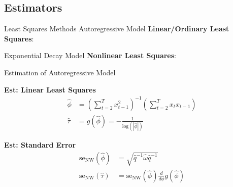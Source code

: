 \documentclass[12pt]{beamer}
\begin{document}
\subsection{Estimators}
\begin{frame}{Least Squares Methods}
Autoregressive Model \textbf{Linear/Ordinary Least Squares}:\\
\begin{center}
\end{center}

Exponential Decay Model \textbf{Nonlinear Least Squares}:\\
\vspace{0.25cm}
\begin{center}
\end{center}
\end{frame}


\begin{frame}{Estimation of Autoregressive Model}
\footnotesize

\textbf{Est: Linear Least Squares}
\begin{align}
    \hat\phi &= (\sum_{t=2}^T x_{t-1}^2)^{-1} (\sum_{t=2}^T x_t x_{t-1})\\
    \hat\tau &= g(\hat\phi) = -\frac{1}{\text{log}(|\hat\phi|)}
\end{align}

\textbf{Est: Standard Error}
\begin{align}
    \text{se}_\text{NW}(\hat\phi) &= \sqrt{\hat q^{-1}\hat\omega\hat q^{-1}}\\
    \text{se}_\text{NW}(\hat\tau) &= \text{se}_\text{NW}(\hat\phi) \frac{d}{d\phi} g(\hat\phi)
\end{align}

\end{frame}
\end{document}

